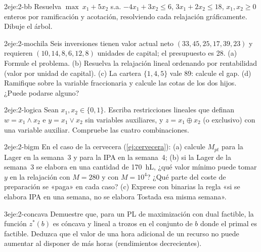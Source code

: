 \begin{ejercicio}{2}{eje:2-bb}
Resuelva $\max\ x_1+5x_2$ s.a. $-4x_1+3x_2\le 6$, $3x_1+2x_2\le 18$, $x_1,x_2\ge 0$ enteros por ramificación y acotación, resolviendo cada relajación gráficamente. Dibuje el árbol.
\end{ejercicio}

\begin{ejercicio}{2}{eje:2-mochila}
Seis inversiones tienen valor actual neto $(33,45,25,17,39,23)$ y requieren $(10,14,8,6,12,8)$ unidades de capital; el presupuesto es 28. (a) Formule el problema. (b) Resuelva la relajación lineal ordenando por rentabilidad (valor por unidad de capital). (c) La cartera $\{1,4,5\}$ vale 89: calcule el gap. (d) Ramifique sobre la variable fraccionaria y calcule las cotas de los dos hijos. ¿Puede podarse alguno?
\end{ejercicio}

\begin{ejercicio}{2}{eje:2-logica}
Sean $x_1,x_2\in\{0,1\}$. Escriba restricciones lineales que definan $w=x_1\wedge x_2$ e $y=x_1\vee x_2$ sin variables auxiliares, y $z=x_1\oplus x_2$ (o exclusivo) con una variable auxiliar. Compruebe las cuatro combinaciones.
\end{ejercicio}

\begin{ejercicio}{2}{eje:2-bigm}
En el caso de la cervecera (\cref{ej:cervecera}): (a) calcule $M_{pt}$ para la Lager en la semana~3 y para la IPA en la semana~4; (b) si la Lager de la semana~3 se elabora en una cantidad de 170~hL, ¿qué valor mínimo puede tomar $y$ en la relajación con $M=280$ y con $M=10^{4}$? ¿Qué parte del coste de preparación se «paga» en cada caso? (c) Exprese con binarias la regla «si se elabora IPA en una semana, no se elabora Tostada esa misma semana».
\end{ejercicio}

\begin{ejercicio}{3}{eje:2-concava}
Demuestre que, para un PL de maximización con dual factible, la función $z^{*}(b)$ es cóncava y lineal a trozos en el conjunto de $b$ donde el primal es factible. Deduzca que el valor de una hora adicional de un recurso no puede aumentar al disponer de más horas (rendimientos decrecientes).
\end{ejercicio}
